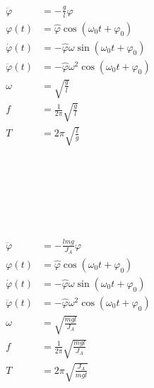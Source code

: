 \begin{boxleft}
\\
\\
\\
\\
\end{boxleft}\begin{boxrightshaded}
\begin{align*}
\ddot{\varphi}&=-\frac{g}{l}\varphi\\
\varphi(t)&=\hat{\varphi}\cos(\omega_0 t+\varphi_0)\\
\dot{\varphi}(t)&=-\hat{\varphi}\omega\sin(\omega_0 t+\varphi_0)\\
\ddot{\varphi}(t)&=-\hat{\varphi}\omega^2\cos(\omega_0 t+\varphi_0)\\
\omega&=\sqrt{\frac{g}{l}}\\
f&=\frac{1}{2\pi}\sqrt{\frac{g}{l}}\\
T&=2\pi\sqrt{\frac{l}{g}}
\end{align*}
\end{boxrightshaded}

\begin{boxleft}
\\
\\
\\
\\
\\
\end{boxleft}\begin{boxrightshaded}
\begin{align*}
\ddot{\varphi}&=-\frac{lmg}{J_A}\varphi\\
\varphi(t)&=\hat{\varphi}\cos(\omega_0 t+\varphi_0)\\
\dot{\varphi}(t)&=-\hat{\varphi}\omega\sin(\omega_0 t+\varphi_0)\\
\ddot{\varphi}(t)&=-\hat{\varphi}\omega^2\cos(\omega_0 t+\varphi_0)\\
\omega&=\sqrt{\frac{mgl}{J_A}}\\
f&=\frac{1}{2\pi}\sqrt{\frac{mgl}{J_A}}\\
T&=2\pi\sqrt{\frac{J_A}{mgl}}
\end{align*}
\end{boxrightshaded}

